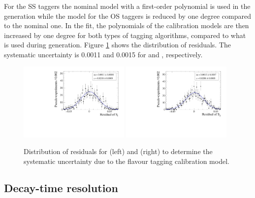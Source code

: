 For the SS taggers the nominal model with a first-order polynomial is used in the generation while the model for the OS taggers is reduced by one degree compared to the nominal one.
In the fit, the polynomials of the calibration models are then increased by one degree for both types of tagging algorithms, compared to what is used during generation. Figure \ref{fig:systUncertFTmodel} shows the distribution of residuals. The systematic uncertainty is \num{0.0011} and \num{0.0015} for \Sf and \Sfbar, respectively.
\begin{figure}[tbp]
    \centering
    \includegraphics[width=0.48\textwidth]{10Systematics/figs/FT_Sf_res.pdf}
    \includegraphics[width=0.48\textwidth]{10Systematics/figs/FT_Sfbar_res.pdf}
    \caption{Distribution of residuals for \Sf (left) and \Sfbar (right) to determine the systematic uncertainty due to the flavour tagging calibration model.}
    \label{fig:systUncertFTmodel}
\end{figure}

\subsection*{Decay-time resolution}

